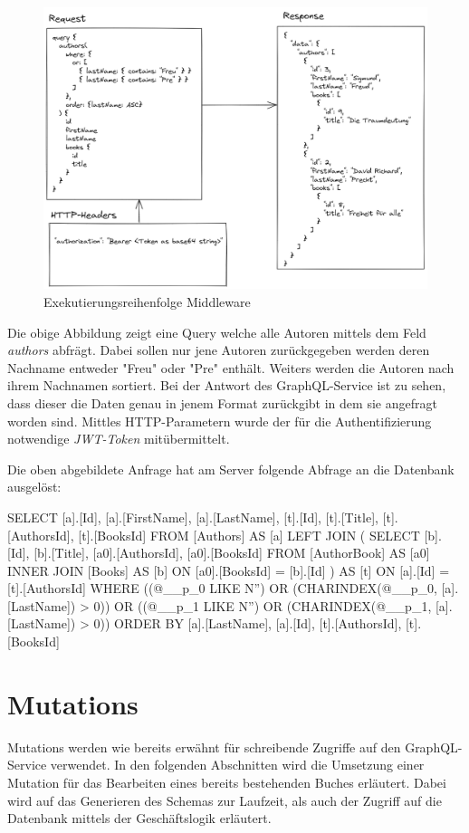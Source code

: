 \begin{figure}[H]
    \includegraphics[width=\textwidth]{pics/authors_request.png}
    \caption{Exekutierungsreihenfolge Middleware}
\end{figure}

Die obige Abbildung zeigt eine Query welche alle Autoren mittels dem Feld \textit{authors} abfrägt.
Dabei sollen nur jene Autoren zurückgegeben werden deren Nachname entweder "Freu" oder "Pre" enthält.
Weiters werden die Autoren nach ihrem Nachnamen sortiert.
Bei der Antwort des GraphQL-Service ist zu sehen, dass dieser die Daten genau in jenem Format zurückgibt in dem sie angefragt worden sind.
Mittles HTTP-Parametern wurde der für die Authentifizierung notwendige \textit{JWT-Token} mitübermittelt.
\newline

Die oben abgebildete Anfrage hat am Server folgende Abfrage an die Datenbank ausgelöst:
\begin{JsCode}
SELECT [a].[Id], [a].[FirstName], [a].[LastName], [t].[Id], [t].[Title], [t].[AuthorsId], [t].[BooksId]
FROM [Authors] AS [a]
LEFT JOIN (
    SELECT [b].[Id], [b].[Title], [a0].[AuthorsId], [a0].[BooksId]
    FROM [AuthorBook] AS [a0]
    INNER JOIN [Books] AS [b] ON [a0].[BooksId] = [b].[Id]
) AS [t] ON [a].[Id] = [t].[AuthorsId]
WHERE ((@__p_0 LIKE N'') OR (CHARINDEX(@__p_0, [a].[LastName]) > 0)) OR ((@__p_1 LIKE N'') OR (CHARINDEX(@__p_1, [a].[LastName]) > 0))
ORDER BY [a].[LastName], [a].[Id], [t].[AuthorsId], [t].[BooksId]
\end{JsCode}

\section{Mutations}
Mutations werden wie bereits erwähnt für schreibende Zugriffe auf den GraphQL-Service verwendet.
In den folgenden Abschnitten wird die Umsetzung einer Mutation für das Bearbeiten eines bereits bestehenden Buches erläutert.
Dabei wird auf das Generieren des Schemas zur Laufzeit, als auch der Zugriff auf die Datenbank mittels der Geschäftslogik erläutert.

